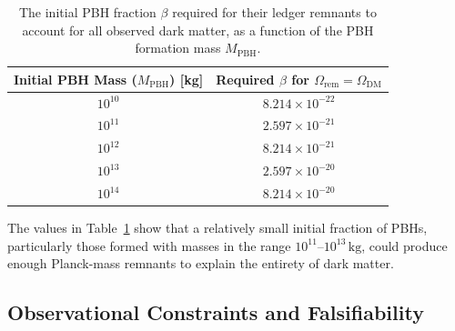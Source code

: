 \documentclass[a4paper, 12pt, oneside]{book}
\numberwithin{equation}{chapter}
\begin{document}
\begin{table}[htbp]
    \centering
    \renewcommand{\arraystretch}{1.2}
    \begin{tabular}{cc}
        \toprule
        \textbf{Initial PBH Mass ($M_{\text{PBH}}$) [kg]} & \textbf{Required $\beta$ for $\Omega_{\text{rem}} = \Omega_{\text{DM}}$} \\
        \midrule
        $10^{10}$ & $8.214 \times 10^{-22}$ \\
        $10^{11}$ & $2.597 \times 10^{-21}$ \\
        $10^{12}$ & $8.214 \times 10^{-21}$ \\
        $10^{13}$ & $2.597 \times 10^{-20}$ \\
        $10^{14}$ & $8.214 \times 10^{-20}$ \\
        \bottomrule
    \end{tabular}
    \caption[The initial PBH fraction]{The initial PBH fraction $\beta$ required for their ledger remnants to account for all observed dark matter, as a function of the PBH formation mass $M_{\text{PBH}}$.}
    \label{tab:betaValues}
\end{table}

The values in Table~\ref{tab:betaValues} show that a relatively small initial fraction of PBHs, particularly those formed with masses in the range $10^{11}$--$10^{13}\,\mathrm{kg}$, could produce enough Planck-mass remnants to explain the entirety of dark matter.

\subsection{Observational Constraints and Falsifiability}
\label{ssec:DMConstraints}
\end{document}
